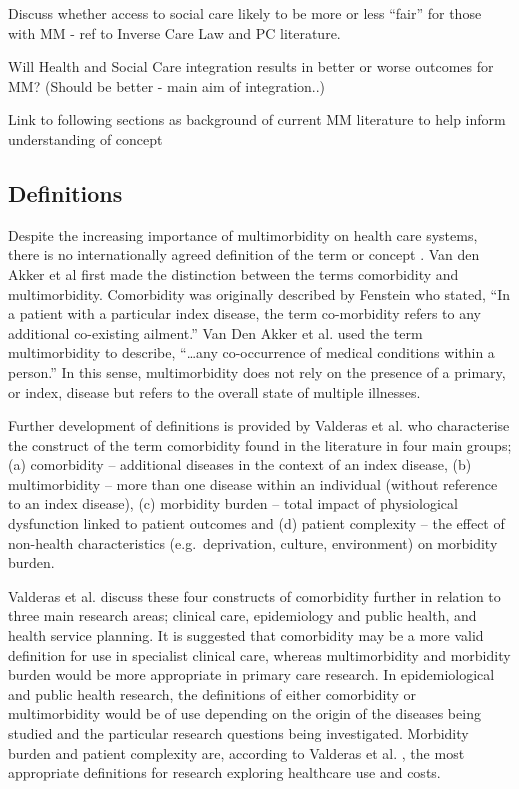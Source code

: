 \documentclass[12pt,]{report}
\begin{document}
Discuss whether access to social care likely to be more or less ``fair''
for those with MM - ref to Inverse Care Law and PC literature.

Will Health and Social Care integration results in better or worse
outcomes for MM? (Should be better - main aim of integration..)

Link to following sections as background of current MM literature to
help inform understanding of concept

\subsection{Definitions}\label{subsec:mm-defs}

Despite the increasing importance of multimorbidity on health care
systems, there is no internationally agreed definition of the term or
concept \citep{RN89, RN95}. Van den Akker et al \citeyearpar{RN19} first
made the distinction between the terms comorbidity and multimorbidity.
Comorbidity was originally described by Fenstein \citep[pp.467]{RN338}
who stated, ``In a patient with a particular index disease, the term
co-morbidity refers to any additional co-existing ailment.'' Van Den
Akker et al. \citeyearpar[pp.65]{RN19} used the term multimorbidity to
describe, ``\ldots{}any co-occurrence of medical conditions within a
person.'' In this sense, multimorbidity does not rely on the presence of
a primary, or index, disease but refers to the overall state of multiple
illnesses.

Further development of definitions is provided by Valderas et al.
\citep{RN64} who characterise the construct of the term comorbidity
found in the literature in four main groups; (a) comorbidity --
additional diseases in the context of an index disease, (b)
multimorbidity -- more than one disease within an individual (without
reference to an index disease), (c) morbidity burden -- total impact of
physiological dysfunction linked to patient outcomes and (d) patient
complexity -- the effect of non-health characteristics
(e.g.~deprivation, culture, environment) on morbidity burden.

Valderas et al. \citep{RN64} discuss these four constructs of
comorbidity further in relation to three main research areas; clinical
care, epidemiology and public health, and health service planning. It is
suggested that comorbidity may be a more valid definition for use in
specialist clinical care, whereas multimorbidity and morbidity burden
would be more appropriate in primary care research. In epidemiological
and public health research, the definitions of either comorbidity or
multimorbidity would be of use depending on the origin of the diseases
being studied and the particular research questions being investigated.
Morbidity burden and patient complexity are, according to Valderas et
al. \citep{RN64}, the most appropriate definitions for research
exploring healthcare use and costs.
\end{document}
